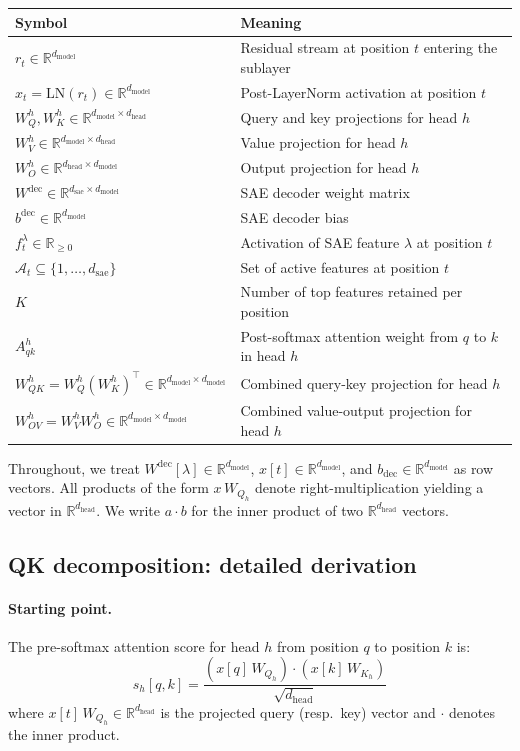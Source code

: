 \documentclass{article} %
\theoremstyle{plain}
\theoremstyle{definition}
\theoremstyle{remark}
\newcommand{\Wdec}{W^{\mathrm{dec}}}
\newcommand{\WQ}{W_Q}
\newcommand{\WK}{W_K}
\newcommand{\WV}{W_V}
\newcommand{\WO}{W_O}
\newcommand{\WOV}{W_{OV}}
\newcommand{\WQK}{W_{QK}}
\newcommand{\dmodel}{d_{\mathrm{model}}}
\newcommand{\dhead}{d_{\mathrm{head}}}
\newcommand{\dsae}{d_{\mathrm{sae}}}
\newcommand{\RR}{\mathbb{R}}
\begin{document}
\begin{table}[h]
\centering
\begin{tabular}{ll}
\toprule
Symbol & Meaning \\
\midrule
$r_t \in \RR^{\dmodel}$ & Residual stream at position $t$ entering the sublayer \\
$x_t = \mathrm{LN}(r_t) \in \RR^{\dmodel}$ & Post-LayerNorm activation at position $t$ \\
$W_{Q}^h, W_{K}^h \in \RR^{\dmodel \times \dhead}$ & Query and key projections for head $h$ \\
$W_{V}^h \in \RR^{\dmodel \times \dhead}$ & Value projection for head $h$ \\
$W_{O}^h \in \RR^{\dhead \times \dmodel}$ & Output projection for head $h$ \\
$\Wdec \in \RR^{\dsae \times \dmodel}$ & SAE decoder weight matrix \\
$b^{\mathrm{dec}} \in \RR^{\dmodel}$ & SAE decoder bias \\
$f^\lambda_t \in \RR_{\geq 0}$ & Activation of SAE feature $\lambda$ at position $t$ \\
$\mathcal{A}_t \subseteq \{1, \ldots, \dsae\}$ & Set of active features at position $t$ \\
$K$ & Number of top features retained per position \\
$A^h_{qk}$ & Post-softmax attention weight from $q$ to $k$ in head $h$ \\
$\WQK^h = \WQ^h (\WK^h)^\top \in \RR^{\dmodel \times \dmodel}$ & Combined query-key projection for head $h$ \\
$\WOV^h = \WV^h \WO^h \in \RR^{\dmodel \times \dmodel}$ & Combined value-output projection for head $h$ \\
\bottomrule
\end{tabular}
\end{table}

Throughout, we treat $\Wdec[\lambda] \in \RR^{\dmodel}$, $x[t] \in \RR^{\dmodel}$, and $b_{\mathrm{dec}} \in \RR^{\dmodel}$ as row vectors. All products of the form $x\,W_{Q_h}$ denote right-multiplication yielding a vector in $\RR^{\dhead}$. We write $a \cdot b$ for the inner product of two $\RR^{\dhead}$ vectors.

\subsection{QK decomposition: detailed derivation}
\label{app:qk_derivation}

\paragraph{Starting point.} The pre-softmax attention score for head $h$ from position $q$ to position $k$ is:
\begin{equation}
    s_h[q,k] = \frac{\left(x[q]\,W_{Q_h}\right) \cdot \left(x[k]\,W_{K_h}\right)}{\sqrt{\dhead}}
\end{equation}
where $x[t]\,W_{Q_h} \in \RR^{\dhead}$ is the projected query (resp.\ key) vector and $\cdot$ denotes the inner product.
\end{document}
